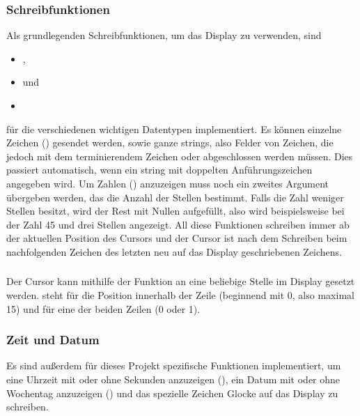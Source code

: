 \subsubsection{Schreibfunktionen}
Als grundlegenden Schreibfunktionen, um das Display zu verwenden, sind
\begin{itemize}
    \item {},
    \item {} und
    \item {}
\end{itemize}
für die verschiedenen wichtigen Datentypen implementiert. Es können einzelne Zeichen () gesendet werden, sowie ganze strings, also Felder von Zeichen, die jedoch mit dem terminierendem Zeichen  oder  abgeschlossen werden müssen. Dies passiert automatisch, wenn ein string mit doppelten Anführungszeichen angegeben wird. Um Zahlen () anzuzeigen muss noch ein zweites Argument übergeben werden, das die Anzahl der Stellen bestimmt. Falls die Zahl weniger Stellen besitzt, wird der Rest mit Nullen aufgefüllt, also wird beispielsweise bei der Zahl 45 und drei Stellen  angezeigt.
\newline
All diese Funktionen schreiben immer ab der aktuellen Position des Cursors und der Cursor ist nach dem Schreiben beim nachfolgenden Zeichen des letzten neu auf das Display geschriebenen Zeichens.
\subsubsection{}
Der Cursor kann mithilfe der Funktion  an eine beliebige Stelle im Display gesetzt werden.  steht für die Position innerhalb der Zeile (beginnend mit 0, also maximal 15) und  für eine der beiden Zeilen (0 oder 1).
\subsubsection{Zeit und Datum}
Es sind außerdem für dieses Projekt spezifische Funktionen implementiert, um eine Uhrzeit mit oder ohne Sekunden anzuzeigen (), ein Datum mit oder ohne Wochentag anzuzeigen () und das spezielle Zeichen Glocke auf das Display zu schreiben.
